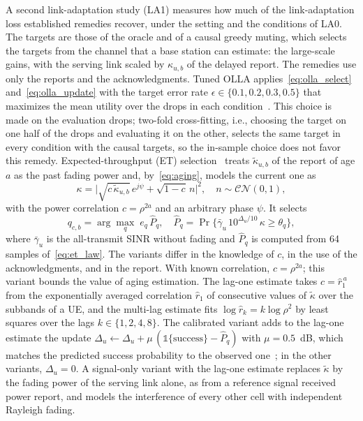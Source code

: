 \documentclass{ieeeaccess}
\begin{document}
A second link-adaptation study (LA1) measures how much of the link-adaptation loss established remedies recover, under the setting and the conditions of LA0. The targets are those of the oracle and of a causal greedy muting, which selects the targets from the channel that a base station can estimate: the large-scale gains, with the serving link scaled by $\kappa_{u,b}$ of the delayed report. The remedies use only the reports and the acknowledgments. Tuned OLLA applies~\eqref{eq:olla_select} and~\eqref{eq:olla_update} with the target error rate $\epsilon \in \{0.1, 0.2, 0.3, 0.5\}$ that maximizes the mean utility over the drops in each condition~\cite{park2015target,wiesmayr2025salad}. This choice is made on the evaluation drops; two-fold cross-fitting, i.e., choosing the target on one half of the drops and evaluating it on the other, selects the same target in every condition with the causal targets, so the in-sample choice does not favor this remedy. Expected-throughput (ET) selection~\cite{kang2014outdated,pellaco2020outdated} treats $\tilde{\kappa}_{u,b}$ of the report of age $a$ as the past fading power and, by~\eqref{eq:aging}, models the current one as
\begin{equation}
\kappa = \bigl| \sqrt{c\, \tilde{\kappa}_{u,b}}\, e^{j\psi} + \sqrt{1 - c}\, n \bigr|^2, \quad n \sim \mathcal{CN}(0, 1),
\label{eq:et_law}
\end{equation}
with the power correlation $c = \rho^{2a}$ and an arbitrary phase $\psi$. It selects
\begin{equation}
q_{c,b} = \arg\max_{q}\; e_q\, \hat{P}_q, \quad \hat{P}_q = \Pr\bigl\{ \bar{\gamma}_u\, 10^{\Delta_u/10}\, \kappa \ge \theta_q \bigr\},
\label{eq:et_select}
\end{equation}
where $\bar{\gamma}_u$ is the all-transmit SINR without fading and $\hat{P}_q$ is computed from 64 samples of~\eqref{eq:et_law}. The variants differ in the knowledge of $c$, in the use of the acknowledgments, and in the report. With known correlation, $c = \rho^{2a}$; this variant bounds the value of aging estimation. The lag-one estimate takes $c = \hat{r}_1^{\,a}$ from the exponentially averaged correlation $\hat{r}_1$ of consecutive values of $\tilde{\kappa}$ over the subbands of a UE, and the multi-lag estimate fits $\log \hat{r}_k = k \log \rho^2$ by least squares over the lags $k \in \{1, 2, 4, 8\}$. The calibrated variant adds to the lag-one estimate the update $\Delta_u \leftarrow \Delta_u + \mu\,(\mathbb{1}\{\text{success}\} - \hat{P}_q)$ with $\mu = 0.5$~dB, which matches the predicted success probability to the observed one~\cite{saxena2022ltsla}; in the other variants, $\Delta_u = 0$. A signal-only variant with the lag-one estimate replaces $\tilde{\kappa}$ by the fading power of the serving link alone, as from a reference signal received power report, and models the interference of every other cell with independent Rayleigh fading.
\end{document}
